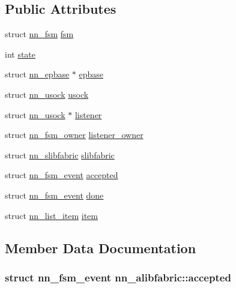 \subsection*{Public Attributes}
\begin{DoxyCompactItemize}
\item 
struct \hyperlink{structnn__fsm}{nn\+\_\+fsm} \hyperlink{structnn__alibfabric_ad969c376667b2c3116ac8d4450ec23e8}{fsm}
\item 
int \hyperlink{structnn__alibfabric_a21e93d82aff04c8a9ae6ba0122396ab4}{state}
\item 
struct \hyperlink{structnn__epbase}{nn\+\_\+epbase} $\ast$ \hyperlink{structnn__alibfabric_a6b8cbf1bd52a83e5420c21f7a1970fd5}{epbase}
\item 
struct \hyperlink{structnn__usock}{nn\+\_\+usock} \hyperlink{structnn__alibfabric_ac33d4e6efd8a6f9246e1573b05b7cad3}{usock}
\item 
struct \hyperlink{structnn__usock}{nn\+\_\+usock} $\ast$ \hyperlink{structnn__alibfabric_a164d9831253cc912122c3bb2ae674e74}{listener}
\item 
struct \hyperlink{structnn__fsm__owner}{nn\+\_\+fsm\+\_\+owner} \hyperlink{structnn__alibfabric_a78da852e79fbc018efabdb7215671dfc}{listener\+\_\+owner}
\item 
struct \hyperlink{structnn__slibfabric}{nn\+\_\+slibfabric} \hyperlink{structnn__alibfabric_aeb290b975bf6b052ec19e015ff95e6a1}{slibfabric}
\item 
struct \hyperlink{structnn__fsm__event}{nn\+\_\+fsm\+\_\+event} \hyperlink{structnn__alibfabric_aa437f27727644387eb2e42a38c0050ea}{accepted}
\item 
struct \hyperlink{structnn__fsm__event}{nn\+\_\+fsm\+\_\+event} \hyperlink{structnn__alibfabric_a87f3db2d6a717b2d07e7a2acf1d1ef90}{done}
\item 
struct \hyperlink{structnn__list__item}{nn\+\_\+list\+\_\+item} \hyperlink{structnn__alibfabric_a0fa4548f6e507cd776b75470cbbc7d49}{item}
\end{DoxyCompactItemize}


\subsection{Member Data Documentation}
\subsubsection[{accepted}]{\setlength{\rightskip}{0pt plus 5cm}struct {\bf nn\+\_\+fsm\+\_\+event} nn\+\_\+alibfabric\+::accepted}\hypertarget{structnn__alibfabric_aa437f27727644387eb2e42a38c0050ea}{}\label{structnn__alibfabric_aa437f27727644387eb2e42a38c0050ea}
